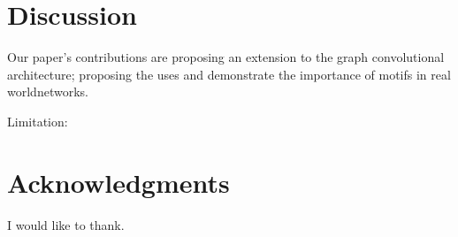 \documentclass{article}
\theoremstyle{definition}
\begin{document}
\section{Discussion}

Our paper's contributions are proposing an extension to the graph convolutional 
architecture; proposing the uses and demonstrate the importance of motifs in
real worldnetworks.

Limitation: 


\section*{Acknowledgments}

I would like to thank.



\end{document}
